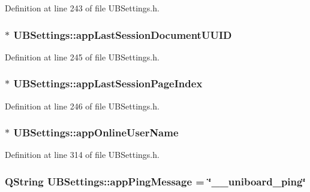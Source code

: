 Definition at line 243 of file U\-B\-Settings.\-h.

\hypertarget{class_u_b_settings_ae969ee680f92f3726ccec1dec0f9e2f5}{
\subsubsection[{app\-Last\-Session\-Document\-U\-U\-I\-D}]{$\ast$ U\-B\-Settings\-::app\-Last\-Session\-Document\-U\-U\-I\-D}}\label{db/d66/class_u_b_settings_ae969ee680f92f3726ccec1dec0f9e2f5}


Definition at line 245 of file U\-B\-Settings.\-h.

\hypertarget{class_u_b_settings_a3d652cedf169318ecb09570f081146f2}{
\subsubsection[{app\-Last\-Session\-Page\-Index}]{$\ast$ U\-B\-Settings\-::app\-Last\-Session\-Page\-Index}}\label{db/d66/class_u_b_settings_a3d652cedf169318ecb09570f081146f2}


Definition at line 246 of file U\-B\-Settings.\-h.

\hypertarget{class_u_b_settings_ae6a9a56f54ae912cf860fb8a88d54255}{
\subsubsection[{app\-Online\-User\-Name}]{$\ast$ U\-B\-Settings\-::app\-Online\-User\-Name}}\label{db/d66/class_u_b_settings_ae6a9a56f54ae912cf860fb8a88d54255}


Definition at line 314 of file U\-B\-Settings.\-h.

\hypertarget{class_u_b_settings_ad837e5831a56b12281b11e84c0ddd61c}{
\subsubsection[{app\-Ping\-Message}]{\setlength{\rightskip}{0pt plus 5cm}Q\-String U\-B\-Settings\-::app\-Ping\-Message = \char`\"{}\-\_\-\-\_\-uniboard\-\_\-ping\char`\"{}\hspace{0.3cm}{\ttfamily [static]}}}\label{db/d66/class_u_b_settings_ad837e5831a56b12281b11e84c0ddd61c}


